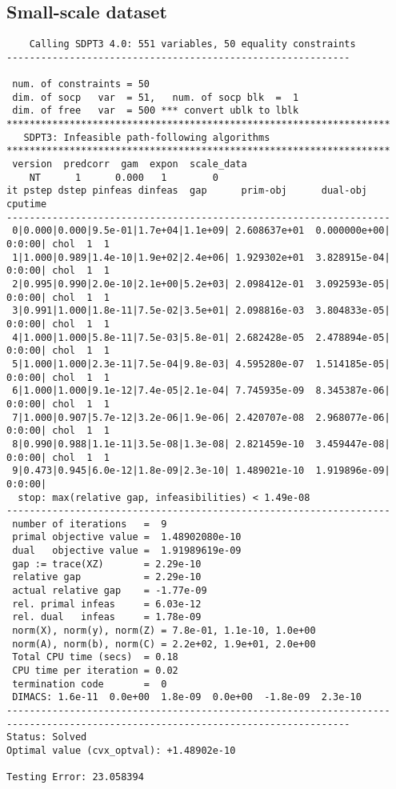 \documentclass[11pt,a4paper]{report}
\begin{document}
\subsection{Small-scale dataset}
\begin{verbatim}
    Calling SDPT3 4.0: 551 variables, 50 equality constraints
------------------------------------------------------------

 num. of constraints = 50
 dim. of socp   var  = 51,   num. of socp blk  =  1
 dim. of free   var  = 500 *** convert ublk to lblk
*******************************************************************
   SDPT3: Infeasible path-following algorithms
*******************************************************************
 version  predcorr  gam  expon  scale_data
    NT      1      0.000   1        0    
it pstep dstep pinfeas dinfeas  gap      prim-obj      dual-obj    cputime
-------------------------------------------------------------------
 0|0.000|0.000|9.5e-01|1.7e+04|1.1e+09| 2.608637e+01  0.000000e+00| 0:0:00| chol  1  1 
 1|1.000|0.989|1.4e-10|1.9e+02|2.4e+06| 1.929302e+01  3.828915e-04| 0:0:00| chol  1  1 
 2|0.995|0.990|2.0e-10|2.1e+00|5.2e+03| 2.098412e-01  3.092593e-05| 0:0:00| chol  1  1 
 3|0.991|1.000|1.8e-11|7.5e-02|3.5e+01| 2.098816e-03  3.804833e-05| 0:0:00| chol  1  1 
 4|1.000|1.000|5.8e-11|7.5e-03|5.8e-01| 2.682428e-05  2.478894e-05| 0:0:00| chol  1  1 
 5|1.000|1.000|2.3e-11|7.5e-04|9.8e-03| 4.595280e-07  1.514185e-05| 0:0:00| chol  1  1 
 6|1.000|1.000|9.1e-12|7.4e-05|2.1e-04| 7.745935e-09  8.345387e-06| 0:0:00| chol  1  1 
 7|1.000|0.907|5.7e-12|3.2e-06|1.9e-06| 2.420707e-08  2.968077e-06| 0:0:00| chol  1  1 
 8|0.990|0.988|1.1e-11|3.5e-08|1.3e-08| 2.821459e-10  3.459447e-08| 0:0:00| chol  1  1 
 9|0.473|0.945|6.0e-12|1.8e-09|2.3e-10| 1.489021e-10  1.919896e-09| 0:0:00|
  stop: max(relative gap, infeasibilities) < 1.49e-08
-------------------------------------------------------------------
 number of iterations   =  9
 primal objective value =  1.48902080e-10
 dual   objective value =  1.91989619e-09
 gap := trace(XZ)       = 2.29e-10
 relative gap           = 2.29e-10
 actual relative gap    = -1.77e-09
 rel. primal infeas     = 6.03e-12
 rel. dual   infeas     = 1.78e-09
 norm(X), norm(y), norm(Z) = 7.8e-01, 1.1e-10, 1.0e+00
 norm(A), norm(b), norm(C) = 2.2e+02, 1.9e+01, 2.0e+00
 Total CPU time (secs)  = 0.18  
 CPU time per iteration = 0.02  
 termination code       =  0
 DIMACS: 1.6e-11  0.0e+00  1.8e-09  0.0e+00  -1.8e-09  2.3e-10
-------------------------------------------------------------------
------------------------------------------------------------
Status: Solved
Optimal value (cvx_optval): +1.48902e-10
 
Testing Error: 23.058394
\end{verbatim}
\end{document}
